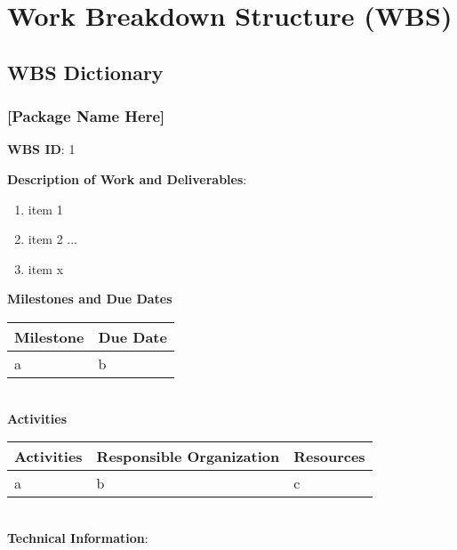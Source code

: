 \clearpage
\def \date {April 14, 2013}
\section {Work Breakdown Structure (WBS)}

\subsection {WBS Dictionary}


\def \wbsPackageName {[Package Name Here]}
\def \wbsPackageID {1}
\subsubsection {\wbsPackageName}


\textbf{WBS ID}: \wbsPackageID


\textbf{Description of Work and Deliverables}:
\begin {enumerate}
	\item item 1
	\item item 2
	...
	\item item x
\end {enumerate}

\textbf{Milestones and Due Dates}

\begin {tabular} {l | l}
Milestone & Due Date \\ \hline
a & b\\
\end {tabular}\\

\textbf{Activities}

\begin {tabular} {l | l | l}
Activities & Responsible Organization & Resources \\ \hline
a & b & c\\
\end {tabular}\\


\textbf{Technical Information}:


